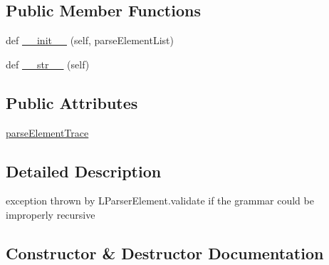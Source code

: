 \subsection*{Public Member Functions}
\begin{DoxyCompactItemize}
\item 
def \hyperlink{classsetuptools_1_1__vendor_1_1pyparsing_1_1RecursiveGrammarException_a32e624155dc4c7301adfefe0cb224c16}{\+\_\+\+\_\+init\+\_\+\+\_\+} (self, parse\+Element\+List)
\item 
def \hyperlink{classsetuptools_1_1__vendor_1_1pyparsing_1_1RecursiveGrammarException_aa7ea07df25add4d6b768b6688ebfcc92}{\+\_\+\+\_\+str\+\_\+\+\_\+} (self)
\end{DoxyCompactItemize}
\subsection*{Public Attributes}
\begin{DoxyCompactItemize}
\item 
\hyperlink{classsetuptools_1_1__vendor_1_1pyparsing_1_1RecursiveGrammarException_a854230101bb16ef67292585e35cd1010}{parse\+Element\+Trace}
\end{DoxyCompactItemize}


\subsection{Detailed Description}
\begin{DoxyVerb}exception thrown by L{ParserElement.validate} if the grammar could be improperly recursive\end{DoxyVerb}
 

\subsection{Constructor \& Destructor Documentation}
\mbox{\label{classsetuptools_1_1__vendor_1_1pyparsing_1_1RecursiveGrammarException_a32e624155dc4c7301adfefe0cb224c16}} 
